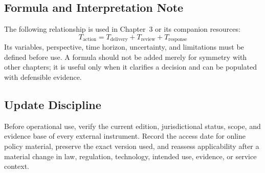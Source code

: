 \subsection{Formula and Interpretation Note}
The following relationship is used in Chapter~3 or its companion resources:
\begin{equation}
T_{\mathrm{action}}=T_{\mathrm{delivery}}+T_{\mathrm{review}}+T_{\mathrm{response}}
\label{eq:comp-ch03-reference-formula}
\end{equation}
Its variables, perspective, time horizon, uncertainty, and limitations must be
defined before use. A formula should not be added merely for symmetry with other
chapters; it is useful only when it clarifies a decision and can be populated with
defensible evidence.

\subsection{Update Discipline}
Before operational use, verify the current edition, jurisdictional status, scope,
and evidence base of every external instrument. Record the access date for online
policy material, preserve the exact version used, and reassess applicability after a
material change in law, regulation, technology, intended use, evidence, or service
context.
